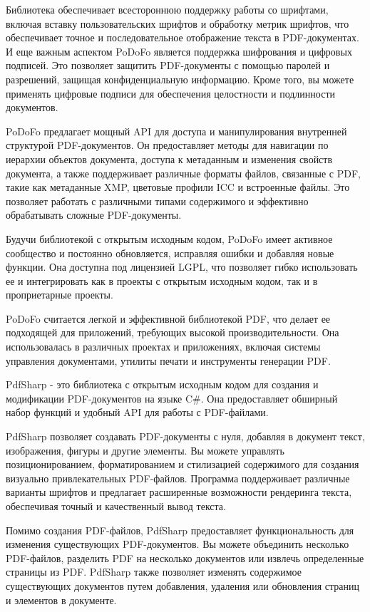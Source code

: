 Библиотека обеспечивает всестороннюю поддержку работы со шрифтами, включая вставку пользовательских шрифтов и обработку метрик шрифтов, что обеспечивает точное и последовательное отображение текста в PDF-документах. И еще важным аспектом PoDoFo является поддержка шифрования и цифровых подписей. Это позволяет защитить PDF-документы с помощью паролей и разрешений, защищая конфиденциальную информацию. Кроме того, вы можете применять цифровые подписи для обеспечения целостности и подлинности документов.

PoDoFo предлагает мощный API для доступа и манипулирования внутренней структурой PDF-документов. Он предоставляет методы для навигации по иерархии объектов документа, доступа к метаданным и изменения свойств документа, а также поддерживает различные форматы файлов, связанные с PDF, такие как метаданные XMP, цветовые профили ICC и встроенные файлы. Это позволяет работать с различными типами содержимого и эффективно обрабатывать сложные PDF-документы.

Будучи библиотекой с открытым исходным кодом, PoDoFo имеет активное сообщество и постоянно обновляется, исправляя ошибки и добавляя новые функции. Она доступна под лицензией LGPL, что позволяет гибко использовать ее и интегрировать как в проекты с открытым исходным кодом, так и в проприетарные проекты.

PoDoFo считается легкой и эффективной библиотекой PDF, что делает ее подходящей для приложений, требующих высокой производительности. Она использовалась в различных проектах и приложениях, включая системы управления документами, утилиты печати и инструменты генерации PDF.

PdfSharp - это библиотека с открытым исходным кодом для создания и модификации PDF-документов на языке C\#. Она предоставляет обширный набор функций и удобный API для работы с PDF-файлами.

PdfSharp позволяет создавать PDF-документы с нуля, добавляя в документ текст, изображения, фигуры и другие элементы. Вы можете управлять позиционированием, форматированием и стилизацией содержимого для создания визуально привлекательных PDF-файлов. Программа поддерживает различные варианты шрифтов и предлагает расширенные возможности рендеринга текста, обеспечивая точный и качественный вывод текста.

Помимо создания PDF-файлов, PdfSharp предоставляет функциональность для изменения существующих PDF-документов. Вы можете объединить несколько PDF-файлов, разделить PDF на несколько документов или извлечь определенные страницы из PDF. PdfSharp также позволяет изменять содержимое существующих документов путем добавления, удаления или обновления страниц и элементов в документе.


